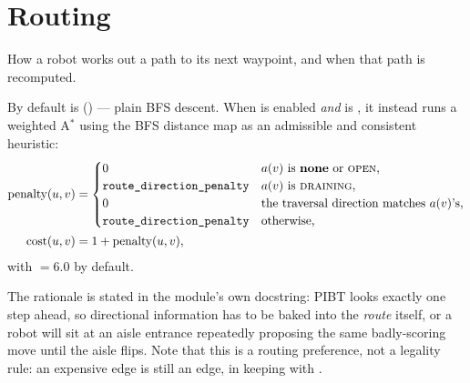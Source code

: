 \section{Routing}
\label{sec:routing}

\begin{lede}
How a robot works out a path to its next waypoint, and when that path is
recomputed.
\end{lede}

By default  is 
() --- plain BFS descent. When
 is enabled \emph{and}
 is , it instead runs a weighted
A$^\ast$ using the BFS distance map as an admissible and consistent heuristic:
\begin{align}
  \mathrm{penalty}(u, v) &=
  \begin{cases}
    0 & a(v) \text{ is \textbf{none} or \textsc{open}},\\
    \texttt{route\_direction\_penalty} & a(v) \text{ is \textsc{draining}},\\
    0 & \text{the traversal direction matches } a(v)\text{'s},\\
    \texttt{route\_direction\_penalty} & \text{otherwise,}
  \end{cases}\\
  \mathrm{cost}(u, v) &= 1 + \mathrm{penalty}(u, v),
\end{align}
with  $= 6.0$ by default.

The rationale is stated in the module's own docstring: PIBT looks exactly one
step ahead, so directional information has to be baked into the \emph{route}
itself, or a robot will sit at an aisle entrance repeatedly proposing the same
badly-scoring move until the aisle flips. Note that this is a routing
preference, not a legality rule: an expensive edge is still an edge, in keeping
with .
